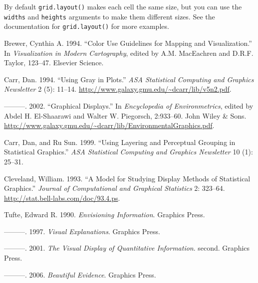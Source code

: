 By default \texttt{grid.layout()} makes each cell the same size, but you
can use the \texttt{widths} and \texttt{heights} arguments to make them
different sizes. See the documentation for \texttt{grid.layout()} for
more examples.

Brewer, Cynthia A. 1994. ``Color Use Guidelines for Mapping and
Visualization.'' In \emph{Visualization in Modern Cartography}, edited
by A.M. MacEachren and D.R.F. Taylor, 123--47. Elsevier Science.

Carr, Dan. 1994. ``Using Gray in Plots.'' \emph{ASA Statistical
Computing and Graphics Newsletter} 2 (5): 11--14.
\url{http://www.galaxy.gmu.edu/~dcarr/lib/v5n2.pdf}.

---------. 2002. ``Graphical Displays.'' In \emph{Encyclopedia of
Environmetrics}, edited by Abdel H. El-Shaarawi and Walter W. Piegorsch,
2:933--60. John Wiley \& Sons.
\url{http://www.galaxy.gmu.edu/~dcarr/lib/EnvironmentalGraphics.pdf}.

Carr, Dan, and Ru Sun. 1999. ``Using Layering and Perceptual Grouping in
Statistical Graphics.'' \emph{ASA Statistical Computing and Graphics
Newsletter} 10 (1): 25--31.

Cleveland, William. 1993. ``A Model for Studying Display Methods of
Statistical Graphics.'' \emph{Journal of Computational and Graphical
Statistics} 2: 323--64. \url{http://stat.bell-labs.com/doc/93.4.ps}.

Tufte, Edward R. 1990. \emph{Envisioning Information}. Graphics Press.

---------. 1997. \emph{Visual Explanations}. Graphics Press.

---------. 2001. \emph{The Visual Display of Quantitative Information}.
second. Graphics Press.

---------. 2006. \emph{Beautiful Evidence}. Graphics Press.
